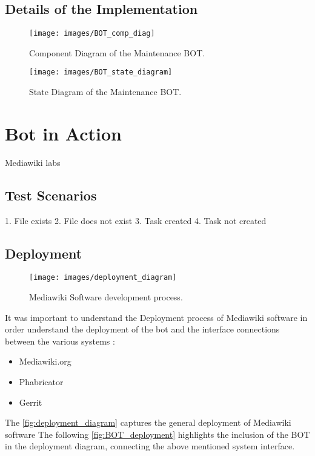 \subsection{Details of the Implementation}



\begin{figure}[H]
  \centering
  \texttt{[image: images/BOT\_comp\_diag]}
  \caption[Component Diagram of the Maintenance BOT]{Component Diagram of the Maintenance BOT.}\label{fig:BOT_comp_diag}
\end{figure}


\begin{figure}[H]
  \centering
  \texttt{[image: images/BOT\_state\_diagram]}
  \caption[State Diagram of the Maintenance BOT]{State Diagram of the Maintenance BOT.}\label{fig:BOT_comp_diag}
\end{figure}




\section{Bot in Action}
Mediawiki labs
\subsection{Test Scenarios}
1. File exists
2. File does not exist
3. Task created
4. Task not created

\subsection{Deployment}


\begin{figure}[H]
  \centering
  \texttt{[image: images/deployment\_diagram]}
  \caption[Mediawiki Software development process]{Mediawiki Software development process.}\label{fig:deployment_diagram}
\end{figure}

It was important to understand the Deployment process of Mediawiki software in order understand the deployment of the bot and the interface connections between the various systems : 
\begin{itemize}
\item Mediawiki.org
\item Phabricator
\item Gerrit
\end{itemize}
The \autoref{fig:deployment_diagram} captures the general deployment of Mediawiki software The following \autoref{fig:BOT_deployment} highlights the inclusion of the BOT in the deployment diagram, connecting the above mentioned system interface.

